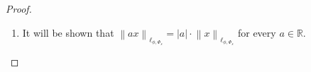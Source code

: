 \documentclass[10pt,a4paper]{amsart}
\begin{document}
\begin{proof}
\begin{enumerate}
\begin{enumerate}
            \item[($\Rightarrow$)] Assume $\left\lVert x \right\rVert _{\ell_{\phi,\Phi_s}}=0$. Observe that $\left\lVert x\right\rVert _{\ell_{\phi,\Phi_s}} =\sup_{m\in\mathbb{Z}, N\in\mathbb{N}_0} \left\lVert x\right\rVert _{\phi,\Phi_s, m, N}=0$. It means $\left\lVert x\right\rVert _{\phi,\Phi_s, m, N}=0$. By Lemma 3.6, it can be obtained that $\frac{\phi\left(2N+1\right)}{\left|S_{m,N}\right|}\sum_{k\in S_{m,N}}\Phi_s\left(a\left|x_k\right|\right)=0$. Therefore, it must be that $\Phi_s\left(a\left|x_k\right|\right) = 0$. Consequently, $x_k = 0$ for all $k \in S_{m,N}$, which implies $x = \left(x_k\right)_{k\in \mathbb{Z}} = 0$. 
            It is proven that $\left\lVert x \right\rVert _{\ell_{\phi,\Phi_s}}=0$ if and only if $x=0$..
        \end{enumerate}
        
        \item It will be shown that $\left\lVert ax \right\rVert _{\ell_{\phi,\Phi_s}}=\left|a\right|\cdot\left\lVert x \right\rVert _{\ell_{\phi,\Phi_s}}$ for every $a \in \mathbb{R}$.
        

\end{enumerate}
\end{proof}
\end{document}

